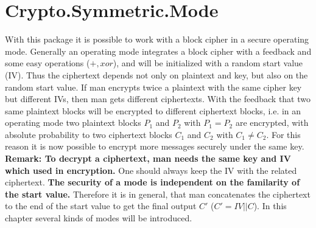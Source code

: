 \chapter{Crypto.Symmetric.Mode}\label{Mode}
With this package it is possible to work with a block cipher in a
secure operating mode. Generally an operating mode integrates a block
cipher with a feedback and some easy operations ($+,xor$), and will be
initialized with a random start value (IV). Thus the ciphertext
depends not only on plaintext and key, but also on the random start
value. If man encrypts twice a plaintext with the same cipher key but
different IVs, then man gets different ciphertexts. With the feedback
that two same plaintext blocks will be encrypted to different
ciphertext blocks, i.e. in an operating mode two plaintext blocks
$P_1$ and $P_2$ with $P_1=P_2$ are encrypted, with absolute
probability to two ciphertext blocks $C_1$ and $C_2$ with $C_1\neq
C_2$. For this reason it is now possible to encrypt more messages
securely under the same key.\\

\noindent\textbf{Remark: To decrypt a ciphertext, man needs the same
  key and IV which used in encryption.}  One should always keep the IV
with the related ciphertext. \textbf{The security of a mode is
  independent on the familarity of the start value.} Therefore it is
in general, that man concatenates the ciphertext to the end of the
start value to get the final output $C'$ ($C'=IV||C$). In this chapter
several kinds of modes will be introduced.


